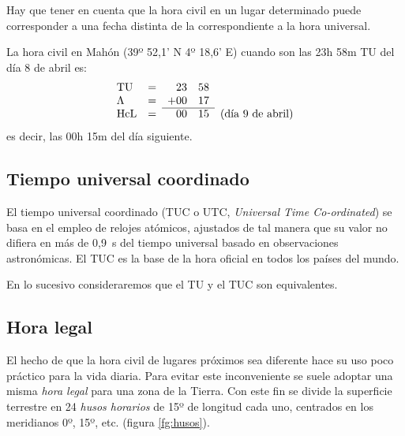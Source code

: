 Hay que tener en cuenta que la hora civil en un lugar determinado puede corresponder a una fecha distinta de la correspondiente a la hora universal. 

\begin{ejemplo}
La hora civil en Mahón (39º 52,1’ N 4º 18,6’ E) cuando son las 23h 58m TU del día 8 de abril es: 
\[
\begin{array}{lcrrl}
  \mathrm{TU} &  =  &   23 & 58 \\
  \Lambda        &  =  &   +00 & 17\\ \cline{3-4}
  \mathrm{HcL} &   = &   00 & 15 & \mbox{(día 9 de abril)}\\
\end{array}
\]
es decir, las 00h 15m del día siguiente. 
\end{ejemplo}

\subsection{Tiempo universal coordinado}


El tiempo universal coordinado (TUC o UTC, \emph{Universal Time Co-ordinated}) se basa en el empleo de relojes atómicos, ajustados de tal manera que su valor no difiera en más de 0,9~s del tiempo universal basado en observaciones astronómicas. El TUC es la base de la hora oficial en todos los países del mundo. 

En lo sucesivo consideraremos que el TU y el TUC son equivalentes. 

\subsection{Hora legal}


El hecho de que la hora civil de lugares próximos sea diferente hace su uso poco práctico para la vida diaria. Para evitar este inconveniente se suele adoptar una misma \emph{hora legal} para una zona de la Tierra. Con este fin se divide la superficie terrestre en 24 \emph{husos horarios} de 15º de longitud cada uno, centrados en los meridianos 0º, 15º, etc. (figura \ref{fg:husos}). 

